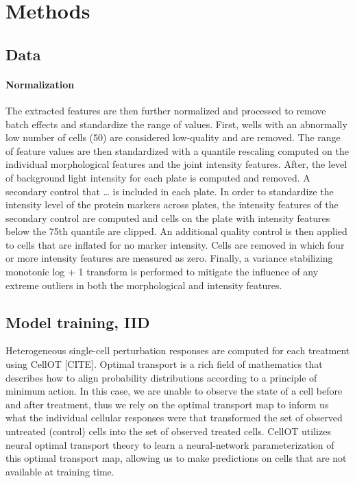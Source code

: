 \section{Methods}

\subsection{Data}

\paragraph{Normalization}
The extracted features are then further normalized and processed to remove batch effects and standardize the range of values. First, wells with an abnormally low number of cells (50) are considered low-quality and are removed. The range of feature values are then standardized with a quantile rescaling computed on the individual morphological features and the joint intensity features. After, the level of background light intensity for each plate is computed and removed. A secondary control that … is included in each plate. In order to standardize the intensity level of the protein markers across plates, the intensity features of the secondary control are computed and cells on the plate with intensity features below the 75th quantile are clipped. An additional quality control is then applied to cells that are inflated for no marker intensity. Cells are removed in which four or more intensity features are measured as zero. Finally, a variance stabilizing monotonic log + 1 transform is performed to mitigate the influence of any extreme outliers in both the morphological and intensity features.


\subsection{Model training, IID}
Heterogeneous single-cell perturbation responses are computed for each treatment using CellOT [CITE]. Optimal transport is a rich field of mathematics that describes how to align probability distributions according to a principle of minimum action. In this case, we are unable to observe the state of a cell before and after treatment, thus we rely on the optimal transport map to inform us what the individual cellular responses were that transformed the set of observed untreated (control) cells into the set of observed treated cells. CellOT utilizes neural optimal transport theory to learn a neural-network parameterization of this optimal transport map, allowing us to make predictions on cells that are not available at training time.

